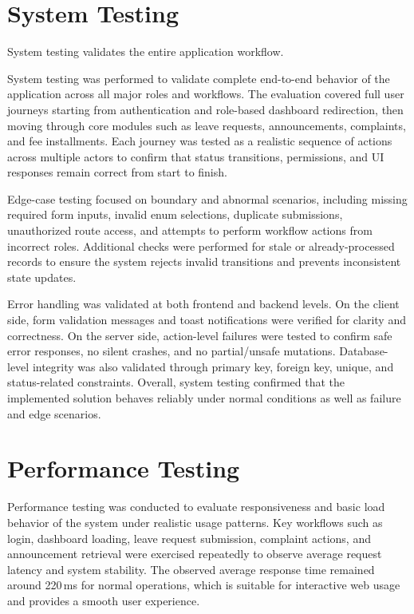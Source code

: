 
\section{System Testing}

System testing validates the entire application workflow.

System testing was performed to validate complete end-to-end behavior of the application across all major roles and workflows. The evaluation covered full user journeys starting from authentication and role-based dashboard redirection, then moving through core modules such as leave requests, announcements, complaints, and fee installments. Each journey was tested as a realistic sequence of actions across multiple actors to confirm that status transitions, permissions, and UI responses remain correct from start to finish.

Edge-case testing focused on boundary and abnormal scenarios, including missing required form inputs, invalid enum selections, duplicate submissions, unauthorized route access, and attempts to perform workflow actions from incorrect roles. Additional checks were performed for stale or already-processed records to ensure the system rejects invalid transitions and prevents inconsistent state updates.

Error handling was validated at both frontend and backend levels. On the client side, form validation messages and toast notifications were verified for clarity and correctness. On the server side, action-level failures were tested to confirm safe error responses, no silent crashes, and no partial/unsafe mutations. Database-level integrity was also validated through primary key, foreign key, unique, and status-related constraints. Overall, system testing confirmed that the implemented solution behaves reliably under normal conditions as well as failure and edge scenarios.


\section{Performance Testing}

Performance testing was conducted to evaluate responsiveness and basic load behavior of the system under realistic usage patterns. Key workflows such as login, dashboard loading, leave request submission, complaint actions, and announcement retrieval were exercised repeatedly to observe average request latency and system stability. The observed average response time remained around 220\,ms for normal operations, which is suitable for interactive web usage and provides a smooth user experience.

